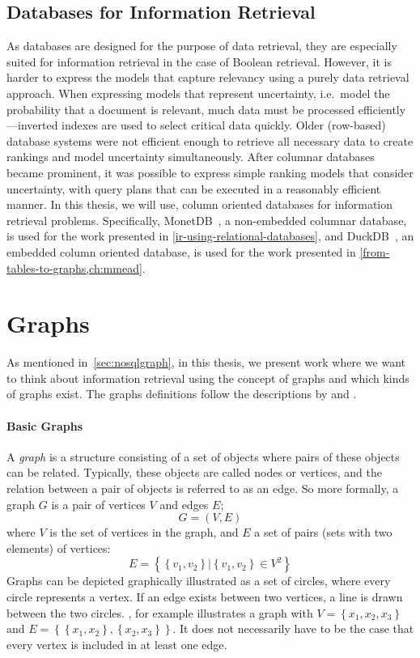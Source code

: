 \subsection{Databases for Information Retrieval}
As databases are designed for the purpose of data retrieval, they are especially suited for information retrieval in the case of Boolean retrieval. However, it is harder to express the models that capture relevancy using a purely data retrieval approach.
When expressing models that represent uncertainty, i.e.\ model the probability that a document is relevant, much data must be processed efficiently—inverted indexes are used to select critical data quickly. Older (row-based) database systems were not efficient enough to retrieve all necessary data to create rankings and model uncertainty simultaneously. After columnar databases became prominent, it was possible to express simple ranking models that consider uncertainty, with query plans that can be executed in a reasonably efficient manner. In this thesis, we will use, column oriented databases for information retrieval problems. Specifically, MonetDB~\citep{monet}, a non-embedded columnar database, is used for the work presented in \cref{ir-using-relational-databases}, and DuckDB~\citep{duckdb}, an embedded column oriented database, is used for the work presented in \cref{from-tables-to-graphs,ch:mmead}.

\section{Graphs}
\label{sec:graphs}
As mentioned in~\cref{sec:nosqlgraph}, in this thesis, we present work where we want to think about information retrieval using the concept of graphs and
which kinds of graphs exist. The graphs definitions follow the descriptions by \citet{big-graphs} and \citet{angles2018property}.

\paragraph{Basic Graphs}
A \emph{graph} is a structure consisting of a set of objects where pairs of these objects can be related. Typically, these objects are called nodes or vertices, and the relation between a pair of objects is referred to as an edge. So more formally, a graph $G$ is a pair of vertices $V$ and edges $E$;
\begin{equation}
	G = (V, E)
\end{equation}
where $V$ is the set of vertices in the graph, and $E$ a set of pairs (sets with two elements) of vertices:
\begin{equation}
	E = \left\{\left\{v_1, v_2\right\} | \left\{v_1, v_2\right\} \in V^2\right\}
	\label{undirected-edges}
\end{equation}
Graphs  can be depicted graphically illustrated as a set of circles, where every circle represents a vertex. If an edge exists between two vertices, a line is drawn between the two circles. , for example illustrates a graph with $V = \left\{x_1, x_2, x_3\right\}$ and $E = \left\{\left\{x_1, x_2\right\}, \left\{x_2, x_3\right\}\right\}$. It does not necessarily have to be the case that every vertex is included in at least one edge.

